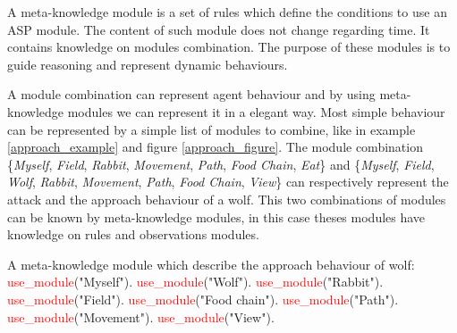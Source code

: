 \documentclass{aamas2012}
\begin{document}
	\begin{definition}
		A meta-knowledge module is a set of rules which define the conditions to use an ASP module.
		The content of such module does not change regarding time.
		It contains knowledge on modules combination.	
		The purpose of these modules is to guide reasoning and represent dynamic behaviours.
	\end{definition}
	
	A module combination can represent agent behaviour and by using meta-knowledge modules we can represent it in a elegant way.
	Most simple behaviour can be represented by a simple list of modules to combine, like in example \ref{approach_example} and figure \ref{approach_figure}.
	The module combination \{\emph{Myself}, \emph{Field}, \emph{Rabbit}, \emph{Movement}, \emph{Path}, \emph{Food Chain}, \emph{Eat}\} 
	and \{\emph{Myself}, \emph{Field}, \emph{Wolf}, \emph{Rabbit}, \emph{Movement}, \emph{Path}, \emph{Food Chain}, \emph{View}\} 
	can respectively represent the attack and the approach behaviour of a wolf.
	This two combinations of modules can be known by meta-knowledge modules, in this case theses modules have knowledge on rules and observations modules.
	
	\begin{example}
		\label{approach_example}
		A meta-knowledge module which describe the approach behaviour of wolf:\newline
		\newline
		\textcolor{red}{use\_module}("Myself").\newline
		\textcolor{red}{use\_module}("Wolf").\newline
		\textcolor{red}{use\_module}("Rabbit").\newline
		\textcolor{red}{use\_module}("Field").\newline
		\textcolor{red}{use\_module}("Food chain").\newline
		\textcolor{red}{use\_module}("Path").\newline
		\textcolor{red}{use\_module}("Movement").\newline
		\textcolor{red}{use\_module}("View").
	\end{example}
	
\end{document}
